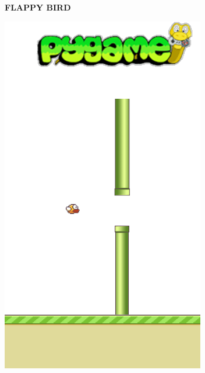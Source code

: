 \documentclass[10pt]{beamer}
\begin{document}
{\begin{frame}[fragile]{\textbf{FLAPPY BIRD}}
\begin{minipage}{0.25\textwidth}
        \includegraphics[scale=0.38]{pipes_ground.png}
    \end{minipage}
\end{frame}
}
\end{document}
